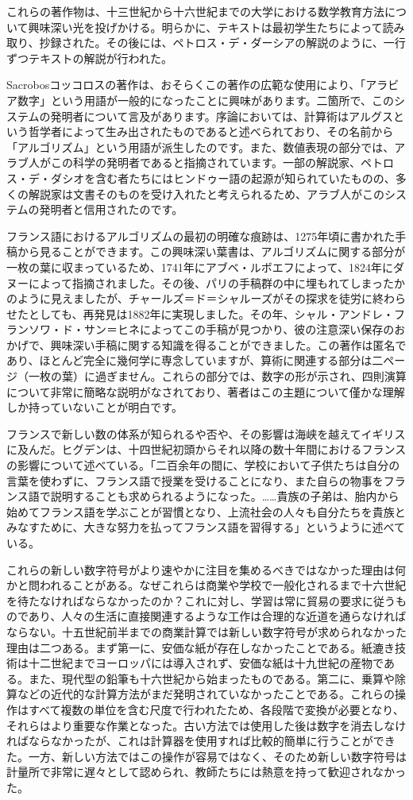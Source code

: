 \documentclass[a4paper,11pt,openany]{ltjsbook}
\begin{document}
これらの著作物は、十三世紀から十六世紀までの大学における数学教育方法について興味深い光を投げかける。明らかに、テキストは最初学生たちによって読み取り、抄録された。その後には、ペトロス・デ・ダーシアの解説のように、一行ずつテキストの解説が行われた。

Sacrobosコッコロスの著作は、おそらくこの著作の広範な使用により、「アラビア数字」という用語が一般的になったことに興味があります。二箇所で、このシステムの発明者について言及があります。序論においては、計算術はアルグスという哲学者によって生み出されたものであると述べられており、その名前から「アルゴリズム」という用語が派生したのです。また、数値表現の部分では、アラブ人がこの科学の発明者であると指摘されています。一部の解説家、ペトロス・デ・ダシオを含む者たちにはヒンドゥー語の起源が知られていたものの、多くの解説家は文書そのものを受け入れたと考えられるため、アラブ人がこのシステムの発明者と信用されたのです。

フランス語におけるアルゴリズムの最初の明確な痕跡は、1275年頃に書かれた手稿から見ることができます。この興味深い葉書は、アルゴリズムに関する部分が一枚の葉に収まっているため、1741年にアブベ・ルボエフによって、1824年にダヌーによって指摘されました。その後、パリの手稿群の中に埋もれてしまったかのように見えましたが、チャールズ＝ド＝シャルーズがその探求を徒労に終わらせたとしても、再発見は1882年に実現しました。その年、シャル・アンドレ・フランソワ・ド・サン＝ヒネによってこの手稿が見つかり、彼の注意深い保存のおかげで、興味深い手稿に関する知識を得ることができました。この著作は匿名であり、ほとんど完全に幾何学に専念していますが、算術に関連する部分は二ページ（一枚の葉）に過ぎません。これらの部分では、数字の形が示され、四則演算について非常に簡略な説明がなされており、著者はこの主題について僅かな理解しか持っていないことが明白です。

フランスで新しい数の体系が知られるや否や、その影響は海峡を越えてイギリスに及んだ。ヒグデンは、十四世紀初頭からそれ以降の数十年間におけるフランスの影響について述べている。「二百余年の間に、学校において子供たちは自分の言葉を使わずに、フランス語で授業を受けることになり、また自らの物事をフランス語で説明することも求められるようになった。……貴族の子弟は、胎内から始めてフランス語を学ぶことが習慣となり、上流社会の人々も自分たちを貴族とみなすために、大きな努力を払ってフランス語を習得する」というように述べている。

これらの新しい数字符号がより速やかに注目を集めるべきではなかった理由は何かと問われることがある。なぜこれらは商業や学校で一般化されるまで十六世紀を待たなければならなかったのか？これに対し、学習は常に貿易の要求に従うものであり、人々の生活に直接関連するような工作は合理的な近道を通らなければならない。十五世紀前半までの商業計算では新しい数字符号が求められなかった理由は二つある。まず第一に、安価な紙が存在しなかったことである。紙漉き技術は十二世紀までヨーロッパには導入されず、安価な紙は十九世紀の産物である。また、現代型の鉛筆も十六世紀から始まったものである。第二に、乗算や除算などの近代的な計算方法がまだ発明されていなかったことである。これらの操作はすべて複数の単位を含む尺度で行われたため、各段階で変換が必要となり、それらはより重要な作業となった。古い方法では使用した後は数字を消去しなければならなかったが、これは計算器を使用すれば比較的簡単に行うことができた。一方、新しい方法ではこの操作が容易ではなく、そのため新しい数字符号は計量所で非常に遅々として認められ、教師たちには熱意を持って歓迎されなかった。
\end{document}
